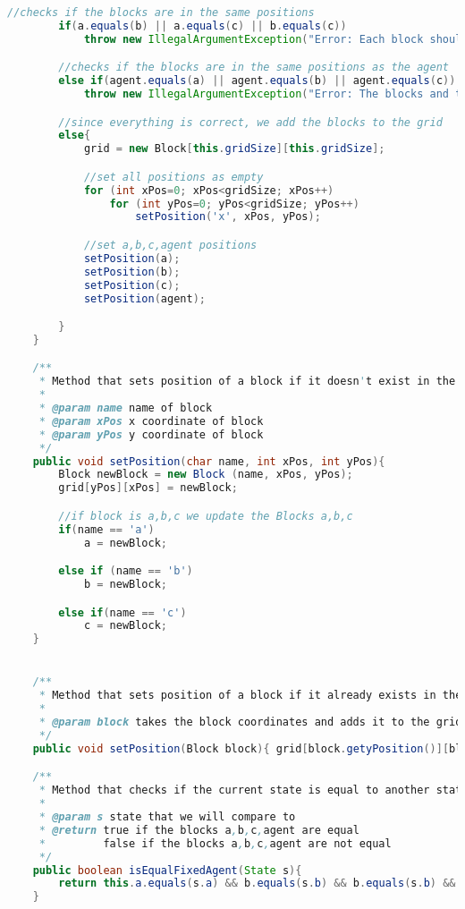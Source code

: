 \documentclass[a4paper, 11pt]{article} %
\begin{document}
\begin{lstlisting}[language=java]
        //checks if the blocks are in the same positions
        if(a.equals(b) || a.equals(c) || b.equals(c))
            throw new IllegalArgumentException("Error: Each block should have a different position within the grid.");

        //checks if the blocks are in the same positions as the agent
        else if(agent.equals(a) || agent.equals(b) || agent.equals(c))
            throw new IllegalArgumentException("Error: The blocks and the agent should be at different positions");

        //since everything is correct, we add the blocks to the grid
        else{
            grid = new Block[this.gridSize][this.gridSize];

            //set all positions as empty
            for (int xPos=0; xPos<gridSize; xPos++)
                for (int yPos=0; yPos<gridSize; yPos++)
                    setPosition('x', xPos, yPos);

            //set a,b,c,agent positions
            setPosition(a);
            setPosition(b);
            setPosition(c);
            setPosition(agent);

        }
    }

    /**
     * Method that sets position of a block if it doesn't exist in the grid
     *
     * @param name name of block
     * @param xPos x coordinate of block
     * @param yPos y coordinate of block
     */
    public void setPosition(char name, int xPos, int yPos){
        Block newBlock = new Block (name, xPos, yPos);
        grid[yPos][xPos] = newBlock;

        //if block is a,b,c we update the Blocks a,b,c
        if(name == 'a')
            a = newBlock;

        else if (name == 'b')
            b = newBlock;

        else if(name == 'c')
            c = newBlock;
    }


    /**
     * Method that sets position of a block if it already exists in the grid
     *
     * @param block takes the block coordinates and adds it to the grid
     */
    public void setPosition(Block block){ grid[block.getyPosition()][block.getxPosition()] = block; }

    /**
     * Method that checks if the current state is equal to another state including the agent
     *
     * @param s state that we will compare to
     * @return true if the blocks a,b,c,agent are equal
     *         false if the blocks a,b,c,agent are not equal
     */
    public boolean isEqualFixedAgent(State s){
        return this.a.equals(s.a) && b.equals(s.b) && b.equals(s.b) && c.equals(s.c) && agent.equals(s.agent);
    }


\end{lstlisting}
\end{document}
